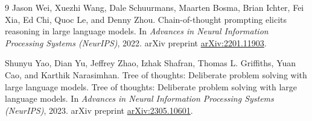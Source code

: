 \documentclass{article}
\begin{document}
\begin{thebibliography}{9}
Jason Wei, Xuezhi Wang, Dale Schuurmans, Maarten Bosma, Brian
Ichter, Fei Xia, Ed Chi, Quoc Le, and Denny Zhou.
\newblock Chain-of-thought prompting elicits reasoning in large
language models.
\newblock In \emph{Advances in Neural Information Processing
  Systems (NeurIPS)}, 2022.
\newblock arXiv preprint
\href{https://arxiv.org/abs/2201.11903}{arXiv:2201.11903}.

Shunyu Yao, Dian Yu, Jeffrey Zhao, Izhak Shafran, Thomas L.
Griffiths, Yuan Cao, and Karthik Narasimhan.
\newblock Tree of thoughts: Deliberate problem solving with large
language models.
\newblock Tree of thoughts: Deliberate problem solving with large
language models.
\newblock In \emph{Advances in Neural Information Processing
  Systems (NeurIPS)}, 2023.
\newblock arXiv preprint
\href{https://arxiv.org/abs/2305.10601}{arXiv:2305.10601}.

\end{thebibliography}
\end{document}
